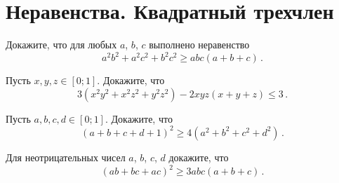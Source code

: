 
\section*{Неравенства. Квадратный трехчлен}


\begin{problems}

\item
Докажите, что для любых $a$, $b$, $c$ выполнено неравенство
\[
    a^2 b^2 + a^2 c^2 + b^2 c^2
\geq
    a b c (a + b + c)
\, . \]

\item
Пусть $x, y, z \in [0; 1]$.
Докажите, что
\[
    3 (x^2 y^2 + x^2 z^2 + y^2 z^2) - 2 x y z (x + y + z)
\leq
    3
\, . \]

\item
Пусть $a, b, c, d \in [0; 1]$.
Докажите, что
\[
    (a + b + c + d + 1)^2
\geq
    4 (a^2 + b^2 + c^2 + d^2)
\, . \]

\item
Для неотрицательных чисел $a$, $b$, $c$, $d$ докажите, что
\[
    (a b + b c + a c)^2
\geq
    3 a b c (a + b + c)
\, . \]

\end{problems}

